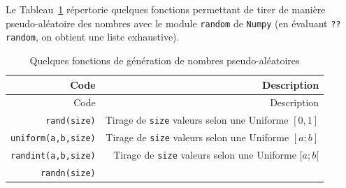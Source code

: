 \documentclass[12pt,]{book}
\numberwithin{equation}{section}
\numberwithin{countremarque}{section}
\begin{document}
Le Tableau~\ref{tab:numpy-pseudo-aleatoires} répertorie quelques
fonctions permettant de tirer de manière pseudo-aléatoire des nombres
avec le module \texttt{random} de \texttt{Numpy} (en évaluant
\texttt{??random}, on obtient une liste exhaustive).

\begin{longtable}[]{@{}rr@{}}
\caption{\label{tab:numpy-pseudo-aleatoires} Quelques fonctions de
génération de nombres pseudo-aléatoires}\tabularnewline
\toprule
\begin{minipage}[b]{0.18\columnwidth}\raggedleft\strut
Code\strut
\end{minipage} & \begin{minipage}[b]{0.71\columnwidth}\raggedleft\strut
Description\strut
\end{minipage}\tabularnewline
\midrule
\endfirsthead
\toprule
\begin{minipage}[b]{0.18\columnwidth}\raggedleft\strut
Code\strut
\end{minipage} & \begin{minipage}[b]{0.71\columnwidth}\raggedleft\strut
Description\strut
\end{minipage}\tabularnewline
\midrule
\endhead
\begin{minipage}[t]{0.18\columnwidth}\raggedleft\strut
\texttt{rand(size)}\strut
\end{minipage} & \begin{minipage}[t]{0.71\columnwidth}\raggedleft\strut
Tirage de \texttt{size} valeurs selon une Uniforme \([0,1]\)\strut
\end{minipage}\tabularnewline
\begin{minipage}[t]{0.18\columnwidth}\raggedleft\strut
\texttt{uniform(a,b,size)}\strut
\end{minipage} & \begin{minipage}[t]{0.71\columnwidth}\raggedleft\strut
Tirage de \texttt{size} valeurs selon une Uniforme \([a ; b]\)\strut
\end{minipage}\tabularnewline
\begin{minipage}[t]{0.18\columnwidth}\raggedleft\strut
\texttt{randint(a,b,size)}\strut
\end{minipage} & \begin{minipage}[t]{0.71\columnwidth}\raggedleft\strut
Tirage de \texttt{size} valeurs selon une Uniforme \([a ; b[\)\strut
\end{minipage}\tabularnewline
\begin{minipage}[t]{0.18\columnwidth}\raggedleft\strut
\texttt{randn(size)}\strut

\end{minipage}
\end{longtable}
\end{document}
